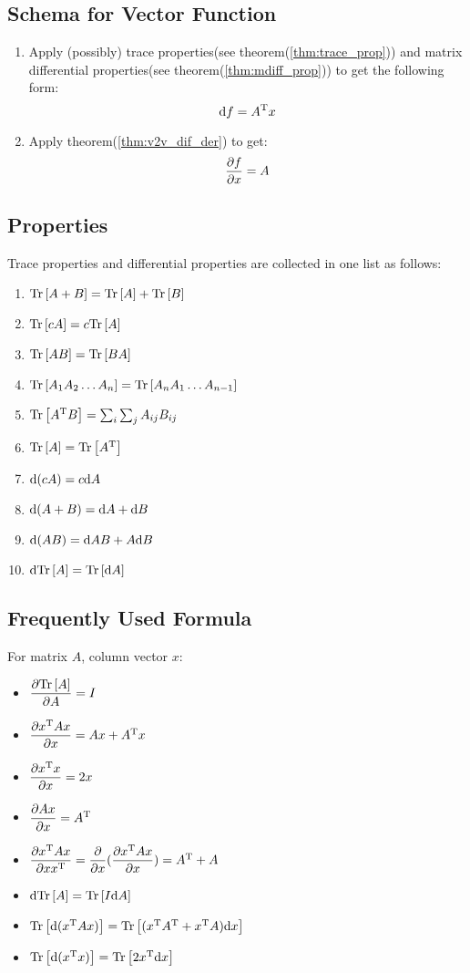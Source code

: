 \subsection{Schema for Vector Function}
\begin{enumerate}
	\item Apply (possibly) trace properties(see theorem(\ref{thm:trace_prop}))
	and matrix differential properties(see theorem(\ref{thm:mdiff_prop}))
	to get the following form:
		\begin{equation}
			\mathrm{d}f = A^\mathrm{T}x
		\end{equation}
	\item Apply theorem(\ref{thm:v2v_dif_der}) to get:
		\begin{equation}
			\dfrac{\partial f}{\partial x} = A
		\end{equation}
\end{enumerate}

\subsection{Properties}

Trace properties and differential properties are 
collected in one list as follows:
\begin{enumerate}
	\item $\mathrm{Tr}\left[A+B\right] = \mathrm{Tr}\left[A\right] + \mathrm{Tr}\left[B\right]$
	\item $\mathrm{Tr}\left[cA\right] = c \mathrm{Tr}\left[A\right]$
	\item $\mathrm{Tr}\left[AB\right] = \mathrm{Tr}\left[BA\right]$
	\item $\mathrm{Tr}\left[A_1A_2 \ldots A_n\right]=\mathrm{Tr}\left[A_nA_1 \ldots A_{n-1}\right]$
	\item $\mathrm{Tr}\left[A^\mathrm{T}B\right] = \sum_{i}\sum_{j}{A_{ij}B_{ij}}$
	\item $\mathrm{Tr}\left[A\right] = \mathrm{Tr}\left[A^\mathrm{T}\right]$
	\item $\mathrm{d}(cA) = c \mathrm{d}A$
	\item $\mathrm{d}(A+B) = \mathrm{d}A + \mathrm{d}B$
	\item $\mathrm{d}(AB) = \mathrm{d}A B + A \mathrm{d}B$
	\item $\mathrm{d}\mathrm{Tr}\left[A\right] = \mathrm{Tr}\left[\mathrm{d}A\right]$
\end{enumerate}

\subsection{Frequently Used Formula}
For matrix $A$, column vector $x$:
\begin{itemize}
	\item $\dfrac{\partial \mathrm{Tr}\left[A\right]}{\partial A} = I$
	\item $\dfrac{\partial x^\mathrm{T} A x}{\partial x} = Ax+A^\mathrm{T}x$
	\item $\dfrac{\partial x^\mathrm{T} x}{\partial x} = 2x$
	\item $\dfrac{\partial Ax}{\partial x} = A^\mathrm{T}$
	\item $\dfrac{\partial x^\mathrm{T} A x}{\partial x x^\mathrm{T}}=\dfrac{\partial }{\partial x}(\dfrac{\partial x^\mathrm{T} A x}{\partial x}) = A^\mathrm{T}+A$
	\item $\mathrm{d}\mathrm{Tr}\left[A\right] = \mathrm{Tr}\left[ I \mathrm{d}A\right]$
	\item $\mathrm{Tr}\left[\mathrm{d}(x^\mathrm{T} A x)\right] = \mathrm{Tr}\left[(x^\mathrm{T}A^\mathrm{T} + x^\mathrm{T}A)\mathrm{d}x\right]$
	\item $\mathrm{Tr}\left[\mathrm{d}(x^\mathrm{T} x)\right] = \mathrm{Tr}\left[2x^\mathrm{T} \mathrm{d}x\right]$
\end{itemize}

